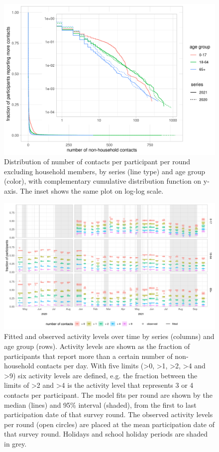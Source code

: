 \documentclass[fleqn,10pt]{wlscirep}
\begin{document}
\begin{figure}[ht]
\centering
\includegraphics[width=\linewidth]{../figures/distribution_contacts.png}
\caption{Distribution of number of contacts per participant per round excluding household members, by series (line type) and age group (color), with complementary cumulative distribution function on y-axis. The inset shows the same plot on log-log scale.}
\label{fig:powerlaw}
\end{figure}

\clearpage

\begin{figure}[ht]
\centering
\includegraphics[width=\linewidth]{../figures/fit_studypopulation_cat6.png}
\caption{Fitted and observed activity levels over time by series (columns) and age group (rows). Activity levels are shown as the fraction of participants that report more than a certain number of non-household contacts per day. With five limits (>0, >1, >2, >4 and >9) six activity levels are defined, e.g. the fraction between the limits of >2 and >4 is the activity level that represents 3 or 4 contacts per participant. The model fits per round are shown by the median (lines) and 95\% interval (shaded), from the first to last participation date of that survey round. The observed activity levels per round (open circles) are placed at the mean participation date of that survey round. Holidays and school holiday periods are shaded in grey.}
\label{fig:studypop}
\end{figure}
\end{document}
